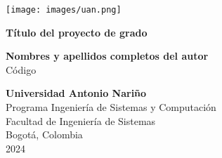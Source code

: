 \begin{titlepage}
    \begin{center}
        \texttt{[image: images/uan.png]}\\
        \vspace*{1cm}

        \Huge
        \textbf{Título del proyecto de grado}
 
        \vspace{2cm}
        
        \large
        \textbf{Nombres y apellidos completos del autor}\\
        Código
 
        \vfill
             
        \vspace{0.8cm}
             
        \textbf{Universidad Antonio Nariño}\\
        Programa Ingeniería de Sistemas y Computación\\
        Facultad de Ingeniería de Sistemas\\
        Bogotá, Colombia\\
        2024
    \end{center}
\end{titlepage}
